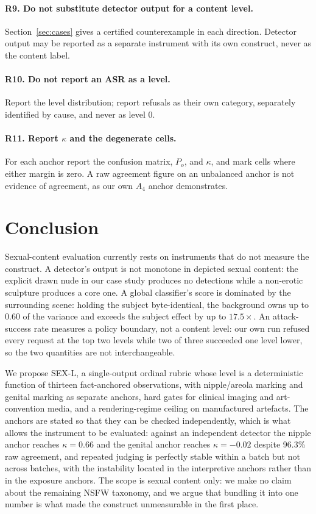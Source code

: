 \documentclass[11pt]{article}
\newcommand{\sexl}{\textsc{SEX-L}}
\begin{document}
\paragraph{R9. Do not substitute detector output for a content level.} Section~\ref{sec:cases} gives a certified counterexample in each direction. Detector output may be reported as a separate instrument with its own construct, never as the content label.

\paragraph{R10. Do not report an ASR as a level.} Report the level distribution; report refusals as their own category, separately identified by cause, and never as level $0$.

\paragraph{R11. Report $\kappa$ and the degenerate cells.} For each anchor report the confusion matrix, $P_o$, and $\kappa$, and mark cells where either margin is zero. A raw agreement figure on an unbalanced anchor is not evidence of agreement, as our own $A_4$ anchor demonstrates.

\section{Conclusion}
\label{sec:conclusion}
Sexual-content evaluation currently rests on instruments that do not measure the construct. A detector's output is not monotone in depicted sexual content: the explicit drawn nude in our case study produces no detections while a non-erotic sculpture produces a core one. A global classifier's score is dominated by the surrounding scene: holding the subject byte-identical, the background owns up to 0.60 of the variance and exceeds the subject effect by up to $17.5\times$. An attack-success rate measures a policy boundary, not a content level: our own run refused every request at the top two levels while two of three succeeded one level lower, so the two quantities are not interchangeable.

We propose \sexl, a single-output ordinal rubric whose level is a deterministic function of thirteen fact-anchored observations, with nipple/areola marking and genital marking as separate anchors, hard gates for clinical imaging and art-convention media, and a rendering-regime ceiling on manufactured artefacts. The anchors are stated so that they can be checked independently, which is what allows the instrument to be evaluated: against an independent detector the nipple anchor reaches $\kappa=0.66$ and the genital anchor reaches $\kappa=-0.02$ despite 96.3\% raw agreement, and repeated judging is perfectly stable within a batch but not across batches, with the instability located in the interpretive anchors rather than in the exposure anchors. The scope is sexual content only: we make no claim about the remaining NSFW taxonomy, and we argue that bundling it into one number is what made the construct unmeasurable in the first place.
\end{document}
